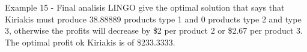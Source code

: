 \begin{frame}{Example 15 - Final analisis}
LINGO give the optimal solution that says that Kiriakis must produce
38.88889 products type 1 and 0 products type 2 and type 3, otherwise
the profits will decrease by \$2 per product 2 or \$2.67 per product 3.
The optimal profit ok Kiriakis is of \$233.3333.
\end{frame}
